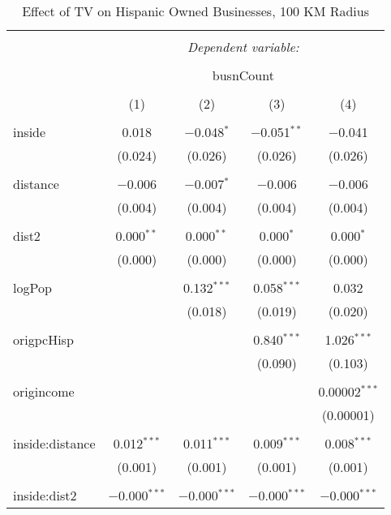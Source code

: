 
\begin{table}[!htbp] \centering 
  \caption{Effect of TV on Hispanic Owned Businesses, 100 KM Radius} 
  \label{} 
\begin{tabular}{@{\extracolsep{-5pt}}lcccc} 
\\[-1.8ex]\hline 
\hline \\[-1.8ex] 
 & \multicolumn{4}{c}{\textit{Dependent variable:}} \\ 
\cline{2-5} 
\\[-1.8ex] & \multicolumn{4}{c}{busnCount} \\ 
\\[-1.8ex] & (1) & (2) & (3) & (4)\\ 
\hline \\[-1.8ex] 
 inside & 0.018 & $-$0.048$^{*}$ & $-$0.051$^{**}$ & $-$0.041 \\ 
  & (0.024) & (0.026) & (0.026) & (0.026) \\ 
  & & & & \\ 
 distance & $-$0.006 & $-$0.007$^{*}$ & $-$0.006 & $-$0.006 \\ 
  & (0.004) & (0.004) & (0.004) & (0.004) \\ 
  & & & & \\ 
 dist2 & 0.000$^{**}$ & 0.000$^{**}$ & 0.000$^{*}$ & 0.000$^{*}$ \\ 
  & (0.000) & (0.000) & (0.000) & (0.000) \\ 
  & & & & \\ 
 logPop &  & 0.132$^{***}$ & 0.058$^{***}$ & 0.032 \\ 
  &  & (0.018) & (0.019) & (0.020) \\ 
  & & & & \\ 
 origpcHisp &  &  & 0.840$^{***}$ & 1.026$^{***}$ \\ 
  &  &  & (0.090) & (0.103) \\ 
  & & & & \\ 
 origincome &  &  &  & 0.00002$^{***}$ \\ 
  &  &  &  & (0.00001) \\ 
  & & & & \\ 
 inside:distance & 0.012$^{***}$ & 0.011$^{***}$ & 0.009$^{***}$ & 0.008$^{***}$ \\ 
  & (0.001) & (0.001) & (0.001) & (0.001) \\ 
  & & & & \\ 
 inside:dist2 & $-$0.000$^{***}$ & $-$0.000$^{***}$ & $-$0.000$^{***}$ & $-$0.000$^{***}$ \\ 

\end{tabular}
\end{table}
